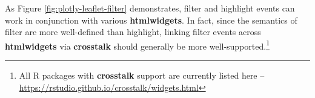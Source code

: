 \documentclass[
  12pt,
]{krantz}
\newenvironment{Shaded}{\begin{snugshade}}{\end{snugshade}}
\newcommand{\DataTypeTok}[1]{\textcolor[rgb]{0.13,0.29,0.53}{#1}}
\newcommand{\DecValTok}[1]{\textcolor[rgb]{0.00,0.00,0.81}{#1}}
\newcommand{\FloatTok}[1]{\textcolor[rgb]{0.00,0.00,0.81}{#1}}
\newcommand{\KeywordTok}[1]{\textcolor[rgb]{0.13,0.29,0.53}{\textbf{#1}}}
\newcommand{\NormalTok}[1]{#1}
\newcommand{\OperatorTok}[1]{\textcolor[rgb]{0.81,0.36,0.00}{\textbf{#1}}}
\newcommand{\StringTok}[1]{\textcolor[rgb]{0.31,0.60,0.02}{#1}}
\begin{document}
As Figure \ref{fig:plotly-leaflet-filter} demonstrates, filter and highlight events can work in conjunction with various \textbf{htmlwidgets}. In fact, since the semantics of filter are more well-defined than highlight, linking filter events across \textbf{htmlwidgets} via \textbf{crosstalk} should generally be more well-supported.\footnote{All R packages with \textbf{crosstalk} support are currently listed here -- \url{https://rstudio.github.io/crosstalk/widgets.html}}

\begin{Shaded}
\end{Shaded}
\end{document}

